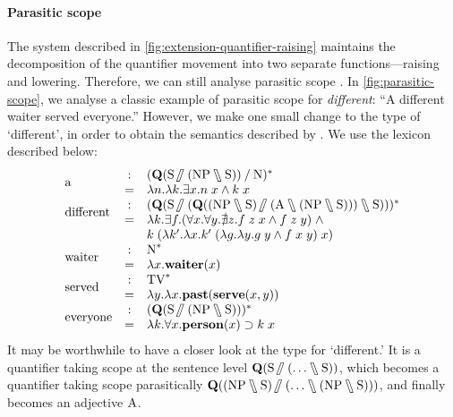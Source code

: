 \documentclass[a4paper]{article}
\begin{document}


\paragraph{Parasitic scope}
The system described in \autoref{fig:extension-quantifier-raising}
maintains the decomposition of the quantifier movement into two
separate functions---raising and lowering. Therefore, we can still
analyse parasitic scope \citep{barker2007}. In
\autoref{fig:parasitic-scope}, we analyse a classic example of
parasitic scope for \emph{different}: ``A different waiter served
everyone.'' However, we make one small change to the type of
`different', in order to obtain the semantics described by
\citet{kiselyov2015b}. We use the lexicon described below:
\[
  \renewcommand*{\arraystretch}{1}
  \begin{array}{l c l}
    \multirow{2}{*}{\text{a}}
    &:& \tr[{(\q[\S\himpl(\NP\himpr\S)]\impl\N)}]\\
    &=& \lambda n. \lambda k. \exists x. n\;x\wedge k\;x\\

    \multirow{2}{*}{\text{different}}
    &:& \tr[{(\q[\S\himpl(\q[(\NP\himpr\S)\himpl(\A\himpr(\NP\himpr\S))]\himpr\S)])}]\\
    &=& \lambda k. \exists f. (\forall x.\forall y.\nexists z.f\;z\;x\wedge f\;z\;y)\;\wedge\\
    & & k\;(\lambda k'.\lambda x.k'\;(\lambda g.\lambda y.g\;y\wedge f\;x\;y)\;x)\\

    \multirow{2}{*}{\text{waiter}}
    &:& \tr[\N]\\
    &=& \lambda x.\WAITER(x)\\

    \multirow{2}{*}{\text{served}}
    &:& \tr[\TV]\\
    &=& \lambda y.\lambda x.\PAST(\SERVE(x,y))\\

    \multirow{2}{*}{\text{everyone}}
    &:& \tr[{(\q[\S\himpl(\NP\himpr\S)])}]\\
    &=& \lambda k.\forall x.\PERSON(x)\supset k\;x
  \end{array}
\]
It may be worthwhile to have a closer look at the type for
`different.' It is a quantifier taking scope at the sentence
level ${\q[\S\himpl(\ldots\himpr\S)]}$, which becomes a quantifier
taking scope parasitically ${\q[(\NP\himpr\S)\himpl(\ldots
\himpr(\NP\himpr\S))]}$, and finally becomes an adjective $\A$.
\end{document}
